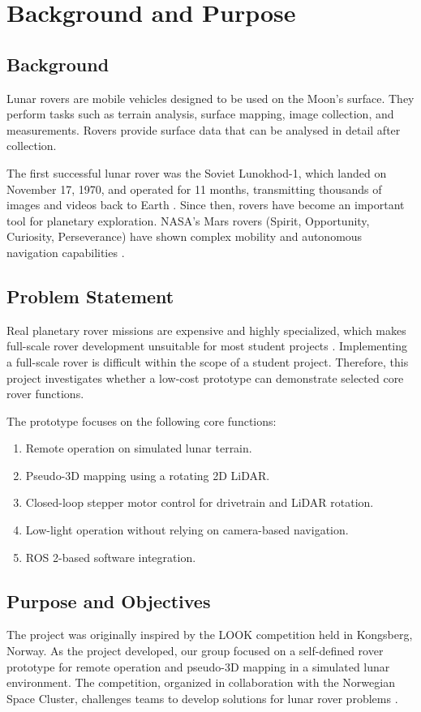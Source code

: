 
\chapter{Background and Purpose}

\section{Background}
Lunar rovers are mobile vehicles designed to be used on the Moon's surface. They perform tasks such as terrain analysis, surface mapping, image collection, and measurements.
Rovers provide surface data that can be analysed in detail after collection.

The first successful lunar rover was the Soviet Lunokhod-1, which landed on November 17, 1970, and operated for 11 months,
transmitting thousands of images and videos back to Earth \cite{FirstRover}. Since then, rovers have become an important tool for planetary exploration.
NASA's Mars rovers (Spirit, Opportunity, Curiosity, Perseverance) have shown complex mobility and autonomous navigation capabilities \cite{nasa_mars_rovers}.


\section{Problem Statement}
Real planetary rover missions are expensive and highly specialized, which makes full-scale rover development unsuitable for most student projects \cite{perseverance_cost}.
Implementing a full-scale rover is difficult within the scope of a student project. Therefore, this project investigates whether a low-cost prototype can demonstrate selected core rover functions.

The prototype focuses on the following core functions:
\begin{enumerate}
    \item Remote operation on simulated lunar terrain.
    \item Pseudo-3D mapping using a rotating 2D LiDAR.
    \item Closed-loop stepper motor control for drivetrain and LiDAR rotation.
    \item Low-light operation without relying on camera-based navigation.
    \item ROS 2-based software integration.
\end{enumerate}

\newpage
\section{Purpose and Objectives}
The project was originally inspired by the LOOK competition held in Kongsberg, Norway. As the project developed, our group focused on a self-defined rover prototype for remote operation and pseudo-3D mapping in a simulated lunar environment.
The competition, organized in collaboration with the Norwegian Space Cluster, challenges teams to develop solutions for lunar rover problems \cite{look}.



